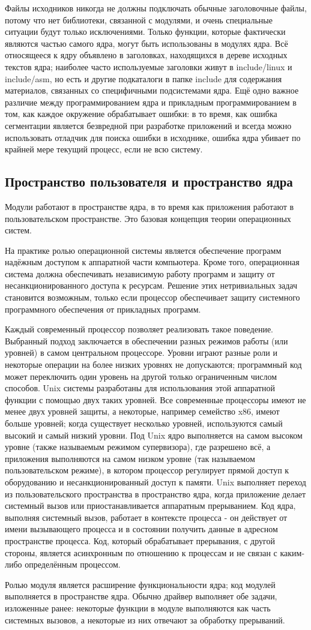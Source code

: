 Файлы исходников никогда не должны подключать обычные заголовочные файлы, потому что нет библиотеки, связанной с модулями, и очень специальные ситуации будут только исключениями. Только функции, которые фактически являются частью самого ядра, могут быть использованы в модулях ядра. Всё относящееся к ядру объявлено в заголовках, находящихся в дереве исходных текстов ядра; наиболее часто используемые заголовки живут в include/linux и include/asm, но есть и другие подкаталоги в папке include для содержания материалов, связанных со специфичными подсистемами ядра. 
Ещё одно важное различие между программированием ядра и прикладным программированием в том, как каждое окружение обрабатывает ошибки: в то время, как ошибка сегментации является безвредной при разработке приложений и всегда можно использовать отладчик для поиска ошибки в исходнике, ошибка ядра убивает по крайней мере текущий процесс, если не всю систему.

\subsection{Пространство пользователя и пространство ядра}
Модули работают в пространстве ядра, в то время как приложения работают в пользовательском пространстве. Это базовая концепция теории операционных систем.

На практике ролью операционной системы является обеспечение программ надёжным доступом к аппаратной части компьютера. Кроме того, операционная система должна обеспечивать независимую работу программ и защиту от несанкционированного доступа к ресурсам. Решение этих нетривиальных задач становится возможным, только если процессор обеспечивает защиту системного программного обеспечения от прикладных программ. 

Каждый современный процессор позволяет реализовать такое поведение. Выбранный подход заключается в обеспечении разных режимов работы (или уровней) в самом центральном процессоре. Уровни играют разные роли и некоторые операции на более низких уровнях не допускаются; программный код может переключить один уровень на другой только ограниченным числом способов. Unix системы разработаны для использования этой аппаратной функции с помощью двух таких уровней. Все современные процессоры имеют не менее двух уровней защиты, а некоторые, например семейство x86, имеют больше уровней; когда существует несколько уровней, используются самый высокий и самый низкий уровни. Под Unix ядро выполняется на самом высоком уровне (также называемым режимом супервизора), где разрешено всё, а приложения выполняются на самом низком уровне (так называемом пользовательском режиме), в котором процессор регулирует прямой доступ к оборудованию и несанкционированный доступ к памяти.
Unix выполняет переход из пользовательского пространства в пространство ядра, когда приложение делает системный вызов или приостанавливается аппаратным прерыванием. Код ядра, выполняя системный вызов, работает в контексте процесса - он действует от имени вызывающего процесса и в состоянии получить данные в адресном пространстве процесса. Код, который обрабатывает прерывания, с другой стороны, является асинхронным по отношению к процессам и не связан с каким-либо определённым процессом. 

Ролью модуля является расширение функциональности ядра; код модулей выполняется в пространстве ядра. Обычно драйвер выполняет обе задачи, изложенные ранее: некоторые функции в модуле выполняются как часть системных вызовов, а некоторые из них отвечают за обработку прерываний.
